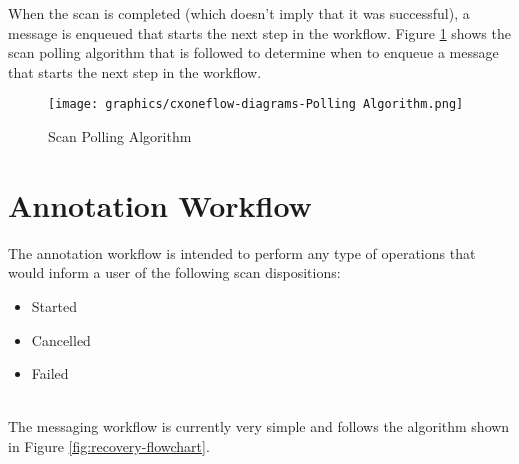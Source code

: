 When the scan is completed (which doesn't imply that it was successful), a message
is enqueued that starts the next step in the workflow.  
Figure \ref{fig:polling-flowchart} shows the scan polling algorithm that is followed
to determine when to enqueue a message that starts the next step in the workflow.

\begin{figure}[ht]
    \texttt{[image: graphics/cxoneflow-diagrams-Polling Algorithm.png]}
    \centering
    \caption{Scan Polling Algorithm}
    \label{fig:polling-flowchart}
\end{figure}

\section{Annotation Workflow}\label{sec:annotation-workflow}

The annotation workflow is intended to perform any type of operations that
would inform a user of the following scan dispositions:

\begin{itemize}
    \item Started
    \item Cancelled
    \item Failed
\end{itemize}

\noindent\\The messaging workflow is currently very simple and follows the algorithm
shown in Figure \ref{fig:recovery-flowchart}.



